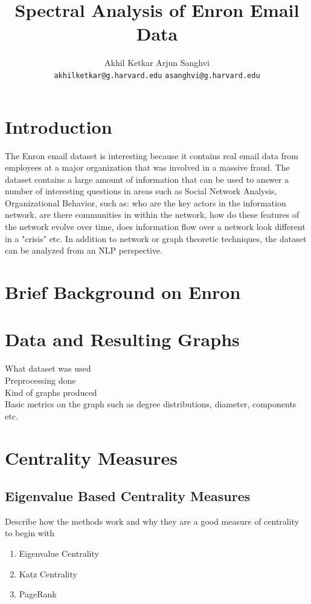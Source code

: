 \documentclass[12pt]{article}
\author{Akhil Ketkar Arjun Sanghvi \\
	\texttt{akhilketkar@g.harvard.edu} \texttt{asanghvi@g.harvard.edu}}
\title{Spectral Analysis of Enron Email Data}
\begin{document}
\maketitle
\section{Introduction}
	The Enron email dataset is interesting because it contains real email data from employees at a major organization that was involved in a massive fraud. The dataset contains a large amount of information that can be used to answer a number of interesting questions in areas such as Social Network Analysis, Organizational Behavior, such as: who are the key actors in the information network, are there communities in within the network, how do these features of the network evolve over time, does information flow over a network look different in a "crisis" etc. In addition to network or graph theoretic techniques, the dataset can be analyzed from an NLP perspective. 

\section{Brief Background on Enron}

\section{Data and Resulting Graphs}
	What dataset was used \\
	Preprocessing done \\ 
	Kind of graphs produced \\
	Basic metrics on the graph such as degree distributions, diameter, components etc.

\section{Centrality Measures} 
	\subsection{Eigenvalue Based Centrality Measures} Describe how the methods work and why they are a good measure of centrality to begin with
	\begin{enumerate}
		\item Eigenvalue Centrality
		\item Katz Centrality
		\item PageRank 
	\end{enumerate}
	
\end{document}
